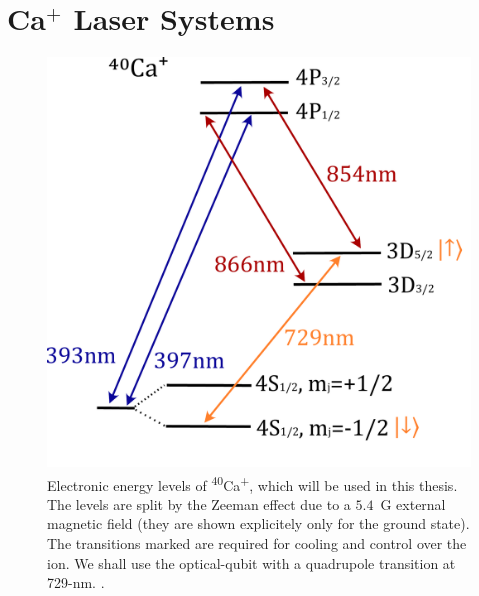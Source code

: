 \section{Ca$^+$ Laser Systems}	
\label{sec:Laser systems}
    \begin{figure}[ht]
        \begin{center}
        \noindent\includegraphics[width=0.4\linewidth]{figures/pdf_figure/Ca40.pdf}
        \end{center}
        \caption{
        Electronic energy levels of \textsuperscript{40}Ca\textsuperscript{+},
        which will be used in this thesis. The levels are
        split by the Zeeman effect due to a $5.4$~G external magnetic field (they are shown explicitely only for the ground state). The
        transitions marked are required for cooling and control over the
        ion. We shall use the optical-qubit with a quadrupole transition at
        729-nm. .
        }

    \label{fig:ion}
    \end{figure}

